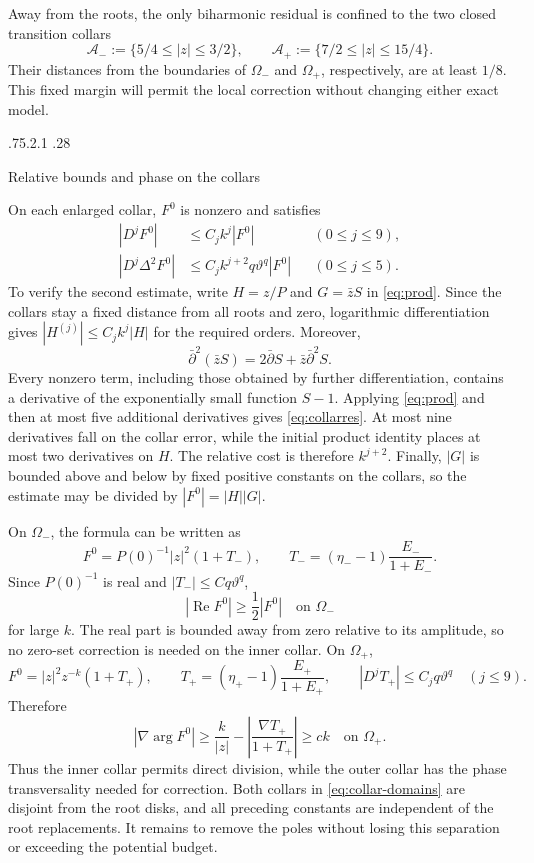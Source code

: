 \documentclass[11pt,a4paper,leqno]{amsart}
\makeatletter
\numberwithin{equation}{section}
\theoremstyle{landisplain}
\theoremstyle{landisdefinition}
\theoremstyle{landisremark}
\newcommand{\pb}{\bar\partial}
\newcommand{\Rea}{\operatorname{Re}}
\renewcommand\subsection{\@startsection{subsection}{2}{\z@}%
  {.75\baselineskip \@plus .2\baselineskip \@minus .1\baselineskip}%
  {.28\baselineskip}%
  {\normalfont\bfseries\raggedright}}
\makeatother
\begin{document}
Away from the roots, the only biharmonic residual is confined
to the two closed transition collars
\[
 \mathcal A_-:=\{5/4\le|z|\le3/2\},\qquad
 \mathcal A_+:=\{7/2\le|z|\le15/4\}.
\]
Their distances from the boundaries of $\Omega_-$ and
$\Omega_+$, respectively, are at least $1/8$. This fixed
margin will permit the local correction without changing either
exact model.

\subsection{Relative bounds and phase on the collars}

On each enlarged collar, $F^0$ is nonzero and satisfies
\begin{align}
 |D^jF^0|&\le C_jk^j|F^0| &&(0\le j\le9),\label{eq:collarF}\\
 |D^j\Delta^2F^0|&\le C_jk^{j+2}q\vartheta^q|F^0|
                                     &&(0\le j\le5).\label{eq:collarres}
\end{align}
To verify the second estimate, write $H=z/P$ and $G=\bar zS$ in
\eqref{eq:prod}. Since the collars stay a fixed distance from all roots
and zero, logarithmic differentiation gives
$|H^{(j)}|\le C_jk^j|H|$ for the required orders. Moreover,
\[
 \pb^2(\bar zS)=2\pb S+\bar z\pb^2S.
\]
Every nonzero term, including those obtained by further
differentiation, contains a derivative of the exponentially small
function $S-1$. Applying \eqref{eq:prod} and then at most
five additional derivatives gives \eqref{eq:collarres}.
At most nine derivatives fall on the collar error, while the
initial product identity places at most two derivatives on $H$.
The relative cost is therefore $k^{j+2}$. Finally, $|G|$ is
bounded above and below by fixed positive constants on the collars,
so the estimate may be divided by $|F^0|=|H||G|$.

On $\Omega_-$, the formula can be written as
\[
 F^0=P(0)^{-1}|z|^2(1+T_-),\qquad
 T_-=(\eta_--1)\frac{E_-}{1+E_-}.
\]
Since $P(0)^{-1}$ is real and $|T_-|\le Cq\vartheta^q$,
\begin{equation}\label{eq:inner-real}
 |\Rea F^0|\ge\frac12|F^0|\quad\text{on }\Omega_-
\end{equation}
for large $k$. The real part is bounded away from zero relative
to its amplitude, so no zero-set correction is needed on the
inner collar. On $\Omega_+$,
\[
 F^0=|z|^2z^{-k}(1+T_+),\qquad
 T_+=(\eta_+-1)\frac{E_+}{1+E_+},\qquad
 |D^jT_+|\le C_jq\vartheta^q\quad(j\le9).
\]
Therefore
\begin{equation}\label{eq:outerphase}
 |\nabla\arg F^0|
 \ge\frac{k}{|z|}-\left|\frac{\nabla T_+}{1+T_+}\right|
 \ge ck\quad\text{on }\Omega_+.
\end{equation}
Thus the inner collar permits direct division, while the outer
collar has the phase transversality needed for correction. Both
collars in \eqref{eq:collar-domains} are disjoint from the root
disks, and all preceding constants are independent of the root
replacements. It remains to remove the poles without losing this
separation or exceeding the potential budget.
\end{document}
